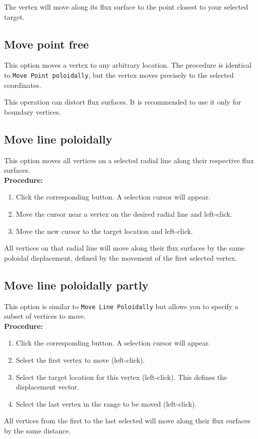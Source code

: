 \documentclass[a4paper,12pt]{article}
\begin{document}
  The vertex will move along its flux surface to the point closest to your selected target.

  \subsection{Move point free}

  This option moves a vertex to any arbitrary location. The procedure is identical to {\tt Move Point poloidally}, but the vertex moves precisely to the selected coordinates.

  \begin{warningbox}
    This operation can distort flux surfaces. It is recommended to use it only for boundary vertices.
  \end{warningbox}

  \subsection{Move line poloidally}

  This option moves all vertices on a selected radial line along their respective flux surfaces. \\

  \textbf{Procedure:}
  \begin{enumerate}[itemsep=2pt,topsep=5pt]
    \item Click the corresponding button. A selection cursor will appear.
    \item Move the cursor near a vertex on the desired radial line and left-click.
    \item Move the new cursor to the target location and left-click.
  \end{enumerate}
  All vertices on that radial line will move along their flux surfaces by the same poloidal displacement, defined by the movement of the first selected vertex.

  \subsection{Move line poloidally partly}

  This option is similar to {\tt Move Line Poloidally} but allows you to specify a subset of vertices to move. \\

  \textbf{Procedure:}
  \begin{enumerate}[itemsep=2pt,topsep=5pt]
    \item Click the corresponding button. A selection cursor will appear.
    \item Select the first vertex to move (left-click).
    \item Select the target location for this vertex (left-click). This defines the displacement vector.
    \item Select the last vertex in the range to be moved (left-click).
  \end{enumerate}
  All vertices from the first to the last selected will move along their flux surfaces by the same distance.
\end{document}
